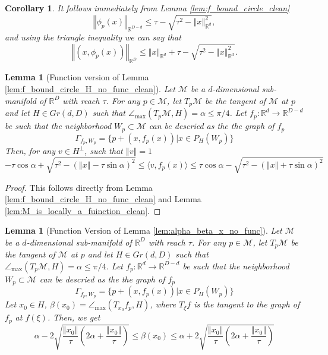 \documentclass[12pt]{article}
\newtheorem{Lemma}[Theorem]{Lemma}
\newtheorem{corollary}[Theorem]{Corollary}
\theoremstyle{remark}
\newcommand{\RR}{\mathbb{R}}
\newcommand{\MM}{\mathcal{M}}
\newcommand{\norm}[1]{\left\Vert #1 \right\Vert}
\newcommand{\lrangle}[1]{\langle #1 \rangle}
\newcommand{\lrbrackets}[1]{\left( #1 \right)}
\newcommand{\maxangle}{\angle_{\max}}
\begin{document}
\begin{appendices}
\begin{corollary}
It follows immediately from Lemma \ref{lem:f_bound_circle_clean} 
\begin{equation}\label{eq:eq:bound_phix_clean}
    \norm{\phi_p(x)}_{\RR^{D-d}} \leq \tau - \sqrt{\tau^2 - \norm{x}_{\RR^d}^2}
,\end{equation}
and using the triangle inequality we can say that
\begin{equation}\label{eq:bound_x_phix_clean}
    \norm{(x,\phi_p(x))}_{\RR^{D}} \leq \norm{x}_{\RR^d} + \tau - \sqrt{\tau^2 - \norm{x}_{\RR^d}^2}
.\end{equation}
\end{corollary}


\begin{Lemma}[Function version of Lemma \ref{lem:f_bound_circle_H_no_func_clean}]\label{lem:f_bound_circle_H_clean}
    Let $\MM$ be a $d$-dimensional sub-manifold of $\RR^D$ with reach $\tau$. For any $p \in \MM$, let $T_{p}\MM$ be the tangent of $\MM$ at $p$ and let $ H\in Gr(d, D) $ such that $ \maxangle(T_p\MM, H) = \alpha \leq \pi/4$.
	Let $f_p:\RR^d\to \RR^{D-d}$ be such that the neighborhood $W_p\subset\MM$ can be descried as the the graph of $f_p$
	\[\Gamma_{f_p,W_p} = \{p + (x, f_p(x)) | x\in P_{H}(W_p)\}\]
	Then, for any $v \in H^\perp$, such that $\norm{v} = 1$
	\[
	-\tau\cos\alpha+\sqrt{\tau^2-(\norm{x} - \tau\sin\alpha)^2} \leq \lrangle{v, f_p(x)} \leq \tau\cos\alpha-\sqrt{\tau^2-(\norm{x} + \tau\sin\alpha)^2}
	\]
\end{Lemma}
\begin{proof}
    This follows directly from Lemma \ref{lem:f_bound_circle_H_no_func_clean} and Lemma \ref{lem:M_is_locally_a_fuinction_clean}.
\end{proof}


\begin{Lemma}[Function Version of Lemma \ref{lem:alpha_beta_x_no_func}]\label{lem:alpha_beta_x}
    Let $\MM$ be a $d$-dimensional sub-manifold of $\RR^D$ with reach $\tau$. For any $p \in \MM$, let $T_{p}\MM$ be the tangent of $\MM$ at $p$ and let $ H\in Gr(d, D) $ such that $ \maxangle(T_p\MM, H) = \alpha \leq \pi/4$.
	Let $f_p:\RR^d\to \RR^{D-d}$ be such that the neighborhood $W_p\subset\MM$ can be descried as the the graph of $f_p$
	\[\Gamma_{f_p,W_p} = \{p + (x, f_p(x)) | x\in P_{H}(W_p)\}\]
    Let $ x_0\in H $, $ \beta(x_0) = \maxangle(T_{x_0}f_p, H) $, where $ T_\xi f $ is the tangent to the graph of $ f_p $ at $ f(\xi) $.
	Then, we get
	\[
	\alpha - 2 \sqrt{ \frac{\norm{x_0}}{\tau}\lrbrackets{2 \alpha + \frac{\norm{x_0}}{\tau}} } 
	\leq \beta(x_0) \leq
	\alpha + 2 \sqrt{ \frac{\norm{x_0}}{\tau}\lrbrackets{2 \alpha + \frac{\norm{x_0}}{\tau}} }
	\]
\end{Lemma}


\end{appendices}
\end{document}
